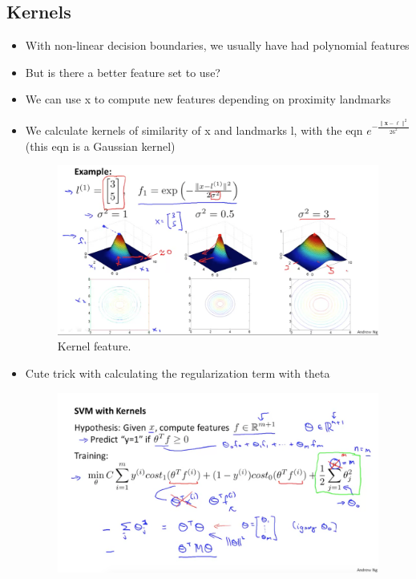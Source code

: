 \documentclass[]{article}
\begin{document}
	\subsection{Kernels}
		\begin{itemize}
			\item With non-linear decision boundaries, we usually have had polynomial features
			\item But is there a better feature set to use?
			\item We can use x to compute new features depending on proximity landmarks
			\item We calculate kernels of similarity of x and landmarks l, with the eqn $e^{-\frac{\| \mathbf{x-\ell} \|^{2}}{26^2}}$ (this eqn is a Gaussian kernel)
			\begin{figure}[ht!]
				\includegraphics[width= 1.5\textwidth,center]{Kernel_Features.png}
				\caption{Kernel feature.}
			\end{figure}
			\item Cute trick with calculating the regularization term with theta
			\begin{figure}[ht!]
				\includegraphics[width= 1.5\textwidth,center]{SVM_Theta_Trick.png}

\end{figure}
\end{itemize}
\end{document}
